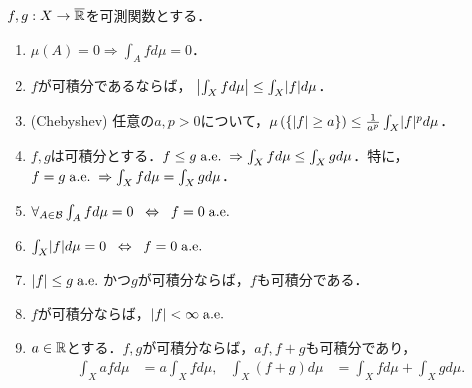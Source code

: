 \documentclass[uplatex, dvipdfmx]{jsreport}
\begin{document}
\begin{theorem}\label{thm-properties-of-integral}
    $f,g:X\to\overline{\mathbb{R}}$を可測関数とする．
    \begin{enumerate}
        \item $\mu(A)=0\Rightarrow\int_Afd\mu=0$．
        \item $f$が可積分であるならば，
        $\left|\int_Xfd\mu\right|\le\int_X\lvert f\rvert d\mu$．
        \item (Chebyshev) 任意の$a,p>0$について，$\mu\left(\left\{\lvert f\rvert\ge a\right\}\right)\le\frac{1}{a^p}\int_X\lvert f\rvert^pd\mu$．
        \item $f,g$は可積分とする．$f\le g\;\mathrm{a.e.}\;\Rightarrow\int_X fd\mu\le\int_Xgd\mu$．特に，$f= g\;\mathrm{a.e.}\;\Rightarrow\int_X fd\mu=\int_Xgd\mu$．
        \item $\forall_{A\in\mathcal{B}}\int_Afd\mu=0\;\;\Leftrightarrow\;\; f=0\;\mathrm{a.e.}\;$
        \item $\int_X\lvert f\rvert d\mu=0\;\;\Leftrightarrow\;\; f=0\;\mathrm{a.e.}\;$
        \item $\lvert f\rvert\le g\;\mathrm{a.e.}\;$かつ$g$が可積分ならば，$f$も可積分である．
        \item $f$が可積分ならば，$\lvert f\rvert<\infty\;\mathrm{a.e.}\;$
        \item $a\in\mathbb{R}$とする．$f,g$が可積分ならば，$af,f+g$も可積分であり，
        \begin{align*}
            \int_Xafd\mu&=a\int_Xfd\mu,&\int_X(f+g)d\mu&=\int_Xfd\mu+\int_Xgd\mu.
        \end{align*}
    \end{enumerate}
\end{theorem}
\end{document}
